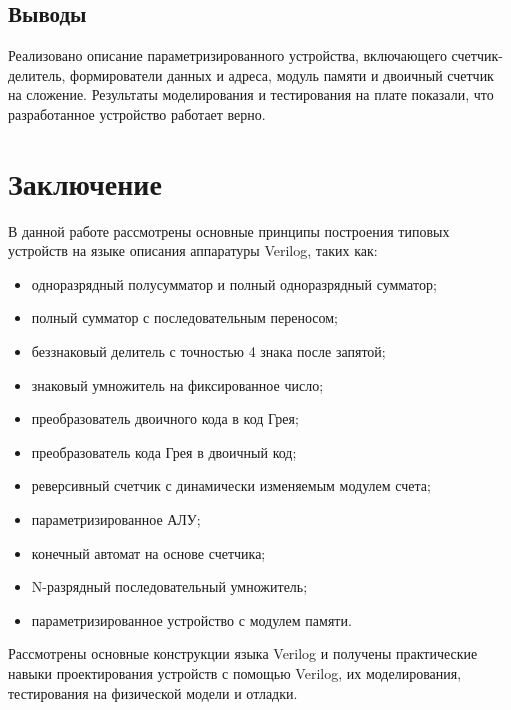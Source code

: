 \subsection{Выводы}

Реализовано описание параметризированного устройства, включающего счетчик-делитель, формирователи данных и адреса, модуль памяти и двоичный счетчик на сложение. Результаты моделирования и тестирования на плате показали, что разработанное устройство работает верно.

\section*{Заключение}


В данной работе рассмотрены основные принципы построения типовых устройств на языке описания аппаратуры Verilog, таких как: 
\begin{itemize}
	\item одноразрядный полусумматор и полный одноразрядный сумматор;
	\item полный сумматор с последовательным переносом;
	\item беззнаковый делитель с точностью 4 знака после запятой;
	\item знаковый умножитель на фиксированное число;
	\item преобразователь двоичного кода в код Грея;
	\item преобразователь кода Грея в двоичный код;
	\item реверсивный счетчик с динамически изменяемым модулем счета;
	\item параметризированное АЛУ;
	\item конечный автомат на основе счетчика;
	\item N-разрядный последовательный умножитель;
	\item параметризированное устройство с модулем памяти. 
\end{itemize}

Рассмотрены основные конструкции языка Verilog и получены практические навыки проектирования устройств с помощью Verilog, их моделирования, тестирования на физической модели и отладки.

